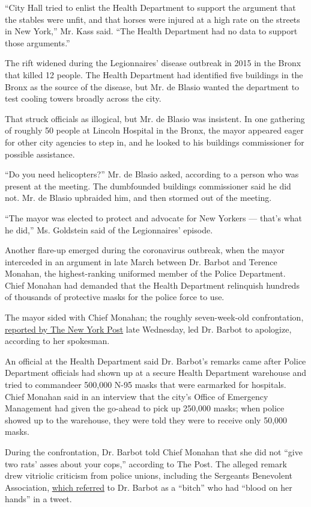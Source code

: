 ``City Hall tried to enlist the Health Department to support the
argument that the stables were unfit, and that horses were injured at a
high rate on the streets in New York,'' Mr. Kass said. ``The Health
Department had no data to support those arguments.''

The rift widened during the Legionnaires' disease outbreak in 2015 in
the Bronx that killed 12 people. The Health Department had identified
five buildings in the Bronx as the source of the disease, but Mr. de
Blasio wanted the department to test cooling towers broadly across the
city.

That struck officials as illogical, but Mr. de Blasio was insistent. In
one gathering of roughly 50 people at Lincoln Hospital in the Bronx, the
mayor appeared eager for other city agencies to step in, and he looked
to his buildings commissioner for possible assistance.

``Do you need helicopters?'' Mr. de Blasio asked, according to a person
who was present at the meeting. The dumbfounded buildings commissioner
said he did not. Mr. de Blasio upbraided him, and then stormed out of
the meeting.

``The mayor was elected to protect and advocate for New Yorkers ---
that's what he did,'' Ms. Goldstein said of the Legionnaires' episode.

Another flare-up emerged during the coronavirus outbreak, when the mayor
interceded in an argument in late March between Dr. Barbot and Terence
Monahan, the highest-ranking uniformed member of the Police Department.
Chief Monahan had demanded that the Health Department relinquish
hundreds of thousands of protective masks for the police force to use.

The mayor sided with Chief Monahan; the roughly seven-week-old
confrontation,
\href{https://nypost.com/2020/05/13/nyc-health-commissioner-wouldnt-supply-nypd-with-masks/}{reported
by The New York Post} late Wednesday, led Dr. Barbot to apologize,
according to her spokesman.

An official at the Health Department said Dr. Barbot's remarks came
after Police Department officials had shown up at a secure Health
Department warehouse and tried to commandeer 500,000 N-95 masks that
were earmarked for hospitals. Chief Monahan said in an interview that
the city's Office of Emergency Management had given the go-ahead to pick
up 250,000 masks; when police showed up to the warehouse, they were told
they were to receive only 50,000 masks.

During the confrontation, Dr. Barbot told Chief Monahan that she did not
``give two rats' asses about your cops,'' according to The Post. The
alleged remark drew vitriolic criticism from police unions, including
the Sergeants Benevolent Association,
\href{https://twitter.com/SBANYPD/status/1260730557190848512}{which
referred} to Dr. Barbot as a ``bitch'' who had ``blood on her hands'' in
a tweet.

